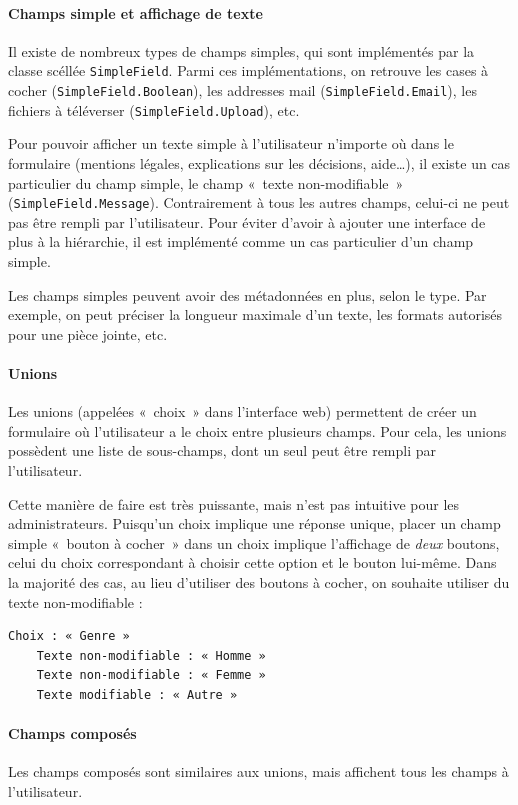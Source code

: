 \paragraph{Champs simple et affichage de texte}
Il existe de nombreux types de champs simples, qui sont implémentés par la classe scéllée \lstinline{SimpleField}.
Parmi ces implémentations, on retrouve les cases à cocher (\lstinline{SimpleField.Boolean}), les addresses mail (\lstinline{SimpleField.Email}), les fichiers à téléverser (\lstinline{SimpleField.Upload}), etc.

Pour pouvoir afficher un texte simple à l'utilisateur n'importe où dans le formulaire (mentions légales, explications sur les décisions, aide…), il existe un cas particulier du champ simple, le champ «~texte non-modifiable~» (\lstinline{SimpleField.Message}).
Contrairement à tous les autres champs, celui-ci ne peut pas être rempli par l'utilisateur.
Pour éviter d'avoir à ajouter une interface de plus à la hiérarchie, il est implémenté comme un cas particulier d'un champ simple.

Les champs simples peuvent avoir des métadonnées en plus, selon le type.
Par exemple, on peut préciser la longueur maximale d'un texte, les formats autorisés pour une pièce jointe, etc.

\paragraph{Unions}
Les unions (appelées «~choix~» dans l'interface web) permettent de créer un formulaire où l'utilisateur a le choix entre plusieurs champs.
Pour cela, les unions possèdent une liste de sous-champs, dont un seul peut être rempli par l'utilisateur.

Cette manière de faire est très puissante, mais n'est pas intuitive pour les administrateurs.
Puisqu'un choix implique une réponse unique, placer un champ simple «~bouton à cocher~» dans un choix implique l'affichage de \emph{deux} boutons, celui du choix correspondant à choisir cette option et le bouton lui-même.
Dans la majorité des cas, au lieu d'utiliser des boutons à cocher, on souhaite utiliser du texte non-modifiable :
\begin{lstlisting}[label={lst:lstlisting}]
Choix : « Genre »
	Texte non-modifiable : « Homme »
	Texte non-modifiable : « Femme »
	Texte modifiable : « Autre »
\end{lstlisting}

\paragraph{Champs composés}
Les champs composés sont similaires aux unions, mais affichent tous les champs à l'utilisateur.

